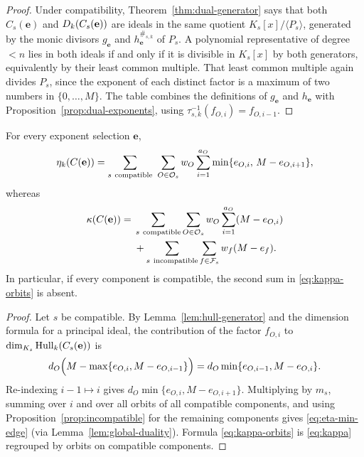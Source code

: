 \begin{proof}
Under compatibility, Theorem~\ref{thm:dual-generator} says that both
$C_s(\mathbf{e})$ and $D_k(C_s(\mathbf{e}))$ are ideals in the same quotient
$K_s[x]/\langle P_s\rangle$, generated by the monic divisors
$g_{\mathbf{e}}$ and $h_{\mathbf{e}}^{\#_{s,k}}$ of $P_s$.  A polynomial
representative of degree $<n$ lies in both ideals if and only if it is
divisible in $K_s[x]$ by both generators, equivalently by their least common
multiple.  That least common multiple again divides $P_s$, since the exponent
of each distinct factor is a maximum of two numbers in $\{0,\ldots,M\}$.  The
table combines the definitions of $g_{\mathbf{e}}$ and $h_{\mathbf{e}}$ with
Proposition~\ref{prop:dual-exponents}, using
$\tau_{s,k}^{-1}(f_{O,i})=f_{O,i-1}$.
\end{proof}

\begin{proposition}\label{prop:min-edge}
For every exponent selection $\mathbf{e}$,
{\small
\begin{equation}\label{eq:eta-min-edge}
\eta_k(C(\mathbf{e}))
 =\sum_{s\ \mathrm{compatible}}\ \sum_{O\in\mathcal O_s}
   w_O\sum_{i=1}^{a_O}\min\{e_{O,i},\,M-e_{O,i+1}\},
\end{equation}
}
whereas
\begin{equation}\label{eq:kappa-orbits}
\begin{split}
\kappa(C(\mathbf{e}))
={}&\sum_{s\ \mathrm{compatible}}\sum_{O\in\mathcal O_s}
w_O\sum_{i=1}^{a_O}(M-e_{O,i})\\
&+\sum_{s\ \mathrm{incompatible}}\sum_{f\in\mathcal F_s}
w_f(M-e_f).
\end{split}
\end{equation}
In particular, if every component is compatible, the second sum in
\eqref{eq:kappa-orbits} is absent.
\end{proposition}

\begin{proof}
Let $s$ be compatible.  By Lemma~\ref{lem:hull-generator} and the dimension
formula for a principal ideal, the contribution of the factor $f_{O,i}$ to
$\dim_{K_s}\operatorname{Hull}_k(C_s(\mathbf{e}))$ is
{\small
\[
d_O\Bigl(M-\max\{e_{O,i},M-e_{O,i-1}\}\Bigr)
   =d_O\min\{e_{O,i-1},M-e_{O,i}\}.
\]
}
Re-indexing $i-1\mapsto i$ gives $d_O\min\{e_{O,i},M-e_{O,i+1}\}$.
Multiplying by $m_s$, summing over $i$ and over all orbits of all compatible
components, and using Proposition~\ref{prop:incompatible} for the remaining
components gives \eqref{eq:eta-min-edge} (via
Lemma~\ref{lem:global-duality}).  Formula \eqref{eq:kappa-orbits} is
\eqref{eq:kappa} regrouped by orbits on compatible components.
\end{proof}

